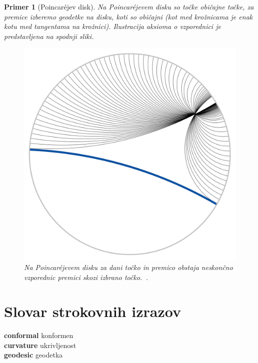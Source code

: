 \documentclass[a4paper]{article}
\newtheorem{primer}{Primer}
\newcommand{\geslo}[2]{\noindent\textbf{#1} \quad \hangindent=1cm #2\\[-1pc]}
\begin{document}
\begin{primer}[Poincar\'ejev disk]
Na Poincar\'ejevem disku so točke običajne točke, za premice izberemo geodetke na disku, koti so običajni (kot med krožnicama je enak kotu med tangentama na krožnici). Ilustracija aksioma o vzporednici je predstavljena na spodnji sliki.
%
\begin{figure}[h!]
\begin{center}
\includegraphics[scale=0.13]{poincare-disk-5aksiom.png}
\caption{Na Poincar\'ejevem disku za dani točko in premico obstaja neskončno vzporednic premici skozi izbrano točko.~\cite[vir slike]{hypGeom-wiki}.}
\end{center}
\end{figure}
%
\end{primer}

\section*{Slovar strokovnih izrazov}

\geslo{conformal}{konformen}

\geslo{curvature}{ukrivljenost}

\geslo{geodesic}{geodetka}
\end{document}
